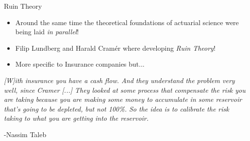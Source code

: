 \documentclass[11pt]{beamer}
\begin{document}
\begin{frame}{Ruin Theory}

\begin{itemize}

\item Around the same time the theoretical foundations of actuarial science were being laid \textit{in parallel}!

\item Filip Lundberg and Harald Cramér where developing \textit{Ruin Theory}!

\item More specific to Insurance companies but...

\end{itemize}
\begin{center}
\textit{[W]ith insurance you have a cash flow. And they understand the problem very well, since Cramer [...] They looked at some process that compensate the risk you are taking because you are making some money to accumulate in some reservoir that's going to be depleted, but not 100\%. So the idea is to calibrate the risk taking to what you are getting into the reservoir.}
\end{center}
\begin{flushright}
-Nassim Taleb
\end{flushright}
\end{frame}
\end{document}
